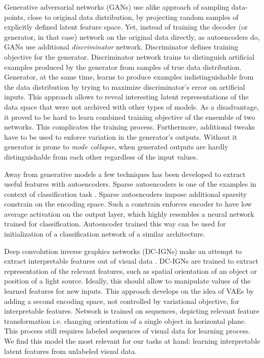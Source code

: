 Generative adversarial networks (GANs) \cite{Goodfellow2014} use alike approach of sampling data-points, close to original data distribution, by projecting random samples of explicitly defined latent feature space.
Yet, instead of training the decoder (or generator, in that case) network on the original data directly, as autoencoders do, GANs use additional \textit{discriminator} network.
Discriminator defines training objective for the generator.
Discriminator network trains to distinguish artificial examples produced by the generator from samples of true data distribution.
Generator, at the same time, learns to produce examples indistinguishable from the data distribution by trying to maximize discriminator's error on artificial inputs.
This approach allows to reveal interesting latent representations of the data space that were not archived with other types of models.
As a disadvantage, it proved to be hard to learn combined training objective of the ensemble of two networks.
This complicates the training process.
Furthermore, additional tweaks have to be used to enforce variation in the generator's outputs.
Without it generator is prone to \textit{mode collapse}, when generated outputs are hardly distinguishable from each other regardless of the input values.

Away from generative models a few techniques has been developed to extract useful features with autoencoders.
Sparse autoencoders is one of the examples in context of classification task \cite{Ng2011, Makhzani2013, Masci2011}.
Sparse autoencoders impose additional sparsity constrain on the encoding space.
Such a constrain enforces encoder to have low average activation on the output layer, which highly resembles a neural network trained for classification.
Autoencoder trained this way can be used for initialization of a classification network of a similar architecture.

Deep convolution inverse graphics networks (DC-IGNs) make an attempt to extract interpretable features out of visual data \cite{Kulkarni2015}.
DC-IGNs are trained to extract representation of the relevant features, such as spatial orientation of an object or position of a light source.
Ideally, this should allow to manipulate values of the learned features for new inputs.
This approach develops on the idea of VAEs by adding a second encoding space, not controlled by variational objective, for interpretable features.
Network is trained on sequences, depicting relevant feature transformation i.e. changing orientation of a single object in horizontal plane.
This process still requires labeled sequences of visual data for learning process.
We find this model the most relevant for our tasks at hand: learning interpretable latent features from unlabeled visual data.

